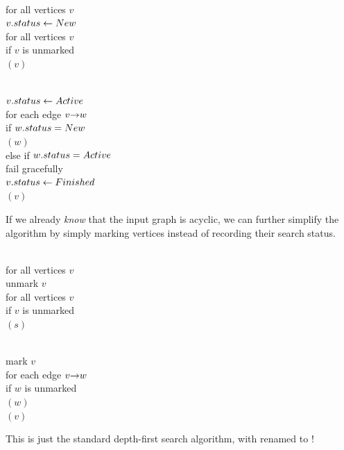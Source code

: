 \begin{center}
\begin{minipage}[c]{0.46\linewidth}
\begin{pseudocode}
\\
for all vertices $v$\\
\Indent $v.status \gets New$\\
for all vertices $v$\\
\Indent if $v$ is unmarked\\
\Indent\Indent {}$(v)$
\end{pseudocode}
\end{minipage}\hfill
\begin{minipage}[c]{0.5\linewidth}
\begin{pseudocode}
\\
$v.status \gets Active$\\
for each edge $v\mathord{\rightarrow}w$\\
\Indent if $w.status = New$\\
\Indent\Indent {}$(w)$\\
\Indent else if $w.status = Active$\\
\Indent\Indent fail gracefully\\
$v.status \gets Finished$\\
$(v)$
\end{pseudocode}
\end{minipage}
\end{center}
If we already \textit{know} that the input graph is acyclic, we can further simplify the algorithm by simply marking vertices instead of recording their search status.

\begin{center}
\begin{minipage}[c]{0.48\linewidth}
\begin{pseudocode}
\\
for all vertices $v$\\
\Indent unmark $v$\\
for all vertices $v$\\
\Indent if $v$ is unmarked\\
\Indent\Indent {}$(s)$
\end{pseudocode}
\end{minipage}\hfill
\begin{minipage}[c]{0.48\linewidth}
\begin{pseudocode}
\\
mark $v$\\
for each edge $v\mathord{\rightarrow}w$\\
\Indent if $w$ is unmarked\\
\Indent\Indent {}$(w)$\\
$(v)$
\end{pseudocode}
\end{minipage}
\end{center}
This is just the standard depth-first search algorithm, with  renamed to !

